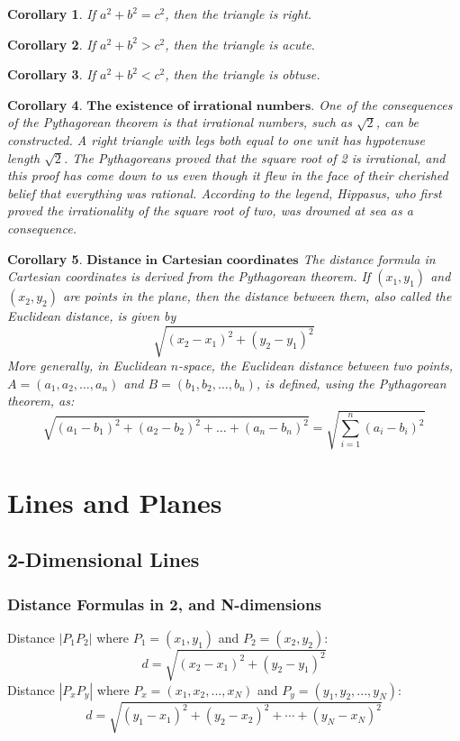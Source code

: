 \documentclass[10pt]{report}
\newtheorem{cor2}{Corollary}[section]
\begin{document}
\begin{cor2}
If $a^{2} + b^{2} = c^{2}$, then the triangle is right.
\end{cor2}
\begin{cor2}
If $a^{2} + b^{2} > c^{2}$, then the triangle is acute.
\end{cor2}
\begin{cor2}
If $a^{2} + b^{2} < c^{2}$, then the triangle is obtuse.
\end{cor2}
\begin{cor2} 
$\textbf{The existence of irrational numbers.}$
One of the consequences of the Pythagorean theorem is that irrational numbers, such as $\sqrt{2}$, can be constructed. A right triangle with legs both equal to one unit has hypotenuse length $\sqrt{2}$. The Pythagoreans proved that the square root of 2 is irrational, and this proof has come down to us even though it flew in the face of their cherished belief that everything was rational. According to the legend, Hippasus, who first proved the irrationality of the square root of two, was drowned at sea as a consequence.
\end{cor2}
\begin{cor2} 
$\textbf{Distance in Cartesian coordinates}$ The distance formula in Cartesian coordinates is derived from the Pythagorean theorem. If $(x_1, y_1)$ and $(x_2, y_2)$ are points in the plane, then the distance between them, also called the Euclidean distance, is given by
$$\sqrt{(x_2-x_1)^2+(y_2-y_1)^2}$$
More generally, in Euclidean $n$-space, the Euclidean distance between two points, $A=(a_1,a_2,\dots,a_n)$ and $B=(b_1,b_2,\dots,b_n)$, is defined, using the Pythagorean theorem, as:
$$\sqrt{(a_1-b_1)^2+(a_2-b_2)^2+\dots +(a_n-b_n)^2}=\sqrt{\sum_{i=1}^n(a_i-b_i)^2}$$
\end{cor2}

\chapter{Lines and Planes}
\section{2-Dimensional Lines}
\subsection{Distance Formulas in 2, and N-dimensions}
Distance $|P_1P_2|$ where $P_1=(x_1, y_1)$ and $P_2=(x_2,y_2)$:
$$d=\sqrt{(x_2-x_1)^2+(y_2-y_1)^2}$$
Distance $|P_xP_y|$ where $P_x=(x_1, x_2,...,x_N)$ and $P_y=(y_1,y_2, ...,y_N)$:
$$d=\sqrt{(y_1-x_1)^2+(y_2-x_2)^2+ \cdots + (y_N-x_N)^2}$$
\end{document}
